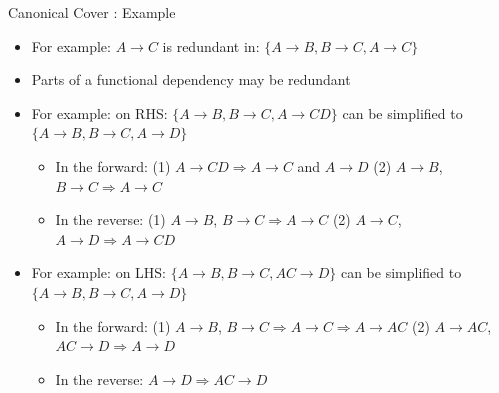 \documentclass[aspectratio=169, xcolor=dvipsnames]{beamer}
\begin{document}
\begin{frame}{Canonical Cover : Example}
    \begin{itemize}[<+->]
        \item For example: $A \rightarrow C$ is redundant in: $\{A \rightarrow B, B \rightarrow C, A \rightarrow C\}$
        \item Parts of a functional dependency may be redundant
        \item For example: on RHS: $\{A \rightarrow B, B \rightarrow C, A \rightarrow CD\}$ can be simplified to $\{A \rightarrow B, B \rightarrow C, A \rightarrow D\}$
        \begin{itemize}
            \item[$\triangleright$] In the forward: (1) $A \rightarrow CD \Rightarrow A \rightarrow C$ and $A \rightarrow D$ (2) $A \rightarrow B$, $B \rightarrow C \Rightarrow A \rightarrow C$
            \item[$\triangleright$] In the reverse: (1) $A \rightarrow B$, $B \rightarrow C \Rightarrow A \rightarrow C$ (2) $A \rightarrow C$, $A \rightarrow D \Rightarrow A \rightarrow CD$
        \end{itemize}
        \item For example: on LHS: $\{A \rightarrow B, B \rightarrow C, AC \rightarrow D\}$ can be simplified to $\{A \rightarrow B, B \rightarrow C, A \rightarrow D\}$
        \begin{itemize}
            \item[$\triangleright$] In the forward: (1) $A \rightarrow B$, $B \rightarrow C \Rightarrow A \rightarrow C \Rightarrow A \rightarrow AC$ (2) $A \rightarrow AC$, $AC \rightarrow D \Rightarrow A \rightarrow D$
            \item[$\triangleright$] In the reverse: $A \rightarrow D \Rightarrow AC \rightarrow D$
        \end{itemize}
    \end{itemize}
\end{frame}
\end{document}
